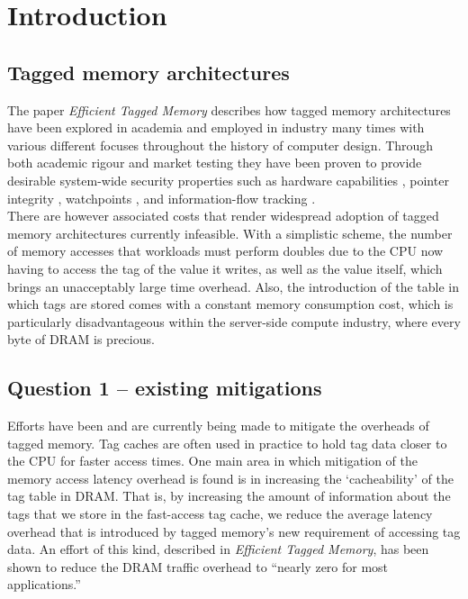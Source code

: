\chapter{Introduction}

\section{Tagged memory architectures}
The paper \textit{Efficient Tagged Memory} \cite{joannou2017efficient} describes how tagged memory architectures have been explored in academia and employed in industry many times with various different focuses throughout the history of computer design. Through both academic rigour and market testing they have been proven to provide desirable system-wide security properties such as hardware capabilities \cite{clark1989application}, pointer integrity \cite{crandall2004minos}, watchpoints \cite{greathouse2012case}, and information-flow tracking \cite{suh2004secure}.\\
There are however associated costs that render widespread adoption of tagged memory architectures currently infeasible. With a simplistic scheme, the number of memory accesses that workloads must perform doubles due to the CPU now having to access the tag of the value it writes, as well as the value itself, which brings an unacceptably large time overhead. Also, the introduction of the table in which tags are stored comes with a constant memory consumption cost, which is particularly disadvantageous within the server-side compute industry, where every byte of DRAM is precious.

\section{Question 1 -- existing mitigations}
Efforts have been and are currently being made to mitigate the overheads of tagged memory. Tag caches are often used in practice to hold tag data closer to the CPU for faster access times. One main area in which mitigation of the memory access latency overhead is found is in increasing the `cacheability' of the tag table in DRAM. That is, by increasing the amount of information about the tags that we store in the fast-access tag cache, we reduce the average latency overhead that is introduced by tagged memory's new requirement of accessing tag data. An effort of this kind, described in \textit{Efficient Tagged Memory}, has been shown to reduce the DRAM traffic overhead to ``nearly zero for most applications.''

